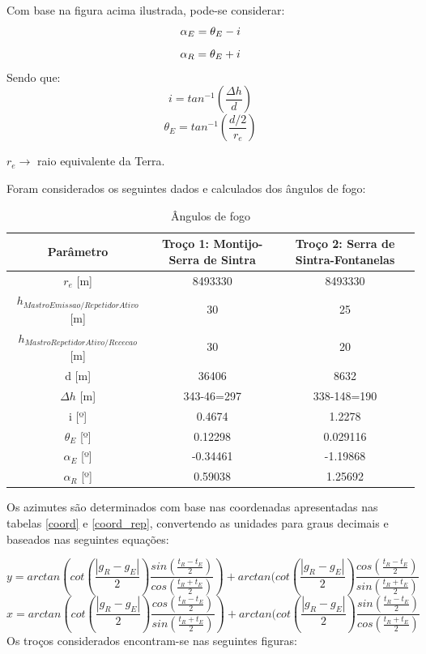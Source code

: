 Com base na figura acima ilustrada, pode-se considerar:
\begin{equation}
\centering
\alpha_{E} = \theta_{E}-i
\end{equation}
\begin{equation}
\centering
\alpha_{R} = \theta_{E}+i
\end{equation}
Sendo que:
\begin{equation}
i = tan^{-1}(\frac{\Delta h}{d})
\end{equation}
\begin{equation}
\theta_{E} = tan^{-1}(\frac{d/2}{r_{e}})
\end{equation}

$r_{e} \rightarrow$ raio equivalente da Terra.

Foram considerados os seguintes dados e calculados dos ângulos de fogo:
\begin{table}[H]
\centering
\begin{tabular}{|c|c|c|}
\hline
Parâmetro & Troço 1: Montijo-Serra de Sintra & Troço 2: Serra de Sintra-Fontanelas\\
\hline
$r_{e}$ [m] & 8493330 & 8493330\\
$h_{MastroEmissao/RepetidorAtivo}$ [m] & 30 & 25\\
$h_{MastroRepetidorAtivo/Rececao}$ [m] & 30 & 20\\
d [m] & 36406 & 8632\\
$\Delta h$ [m] & 343-46=297 & 338-148=190\\
i [º]& 0.4674 & 1.2278\\
$\theta_{E}$ [º] & 0.12298 & 0.029116\\
$\alpha_{E}$ [º] & -0.34461 & -1.19868\\
$\alpha_{R}$ [º] & 0.59038 & 1.25692\\
\hline
\end{tabular}
\caption{Ângulos de fogo}
\label{A_fogo}
\end{table}

Os azimutes são determinados com base nas coordenadas apresentadas nas tabelas \ref{coord} e \ref{coord_rep}, convertendo as unidades para graus decimais e baseados nas seguintes equações:

\begin{equation}
y=arctan(cot(\frac{|g_{R}-g_{E}|}{2})\frac{sin(\frac{t_{R}-t_{E}}{2})}{cos(\frac
{t_{R}+t_{E}}{2})})+arctan(cot(\frac{|g_{R}-g_{E}|}{2})\frac{cos(\frac{t_{R}-t_{E}}{2})}{sin(\frac
{t_{R}+t_{E}}{2})}
\end{equation}
\begin{equation}
x=arctan(cot(\frac{|g_{R}-g_{E}|}{2})\frac{cos(\frac{t_{R}-t_{E}}{2})}{sin(\frac
{t_{R}+t_{E}}{2})})+arctan(cot(\frac{|g_{R}-g_{E}|}{2})\frac{sin(\frac{t_{R}-t_{E}}{2})}{cos(\frac
{t_{R}+t_{E}}{2})}
\end{equation}
Os troços considerados encontram-se nas seguintes figuras:

